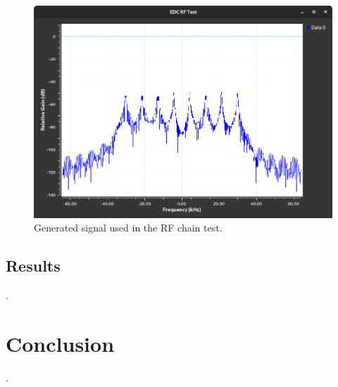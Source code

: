 \begin{figure}[!ht]
    \begin{center}
        \includegraphics[width=\textwidth]{figures/edc_report/edc-rf-test-signal}
        \caption{Generated signal used in the RF chain test.}
        \label{fig:edc-rf-signal}
    \end{center}
\end{figure}

\subsection{Results}

.

\section{Conclusion}

.
